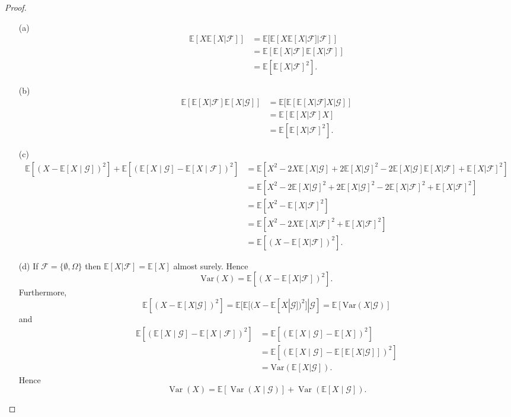 \documentclass{article}
\begin{document}
\begin{proof}
\begin{enumerate}
    \item[(a)] \begin{align*}
        \mathbb{E}[X\mathbb{E}[X|\mathcal{F}]]&=\mathbb{E}[\mathbb{E}[X\mathbb{E}[X|\mathcal{F}]|\mathcal{F}]]\\&=\mathbb{E}[\mathbb{E}[X|\mathcal{F}]\mathbb{E}[X|\mathcal{F}]]\\&=\mathbb{E}[\mathbb{E}[X|\mathcal{F}]^2].
    \end{align*}
    \item[(b)] \begin{align*}
        \mathbb{E}[\mathbb{E}[X|\mathcal{F}]\mathbb{E}[X|\mathcal{G}]]&=\mathbb{E}[\mathbb{E}[\mathbb{E}[X|\mathcal{F}]X|\mathcal{G}]]\\&=\mathbb{E}[\mathbb{E}[X|\mathcal{F}]X]\\&=\mathbb{E}[\mathbb{E}[X|\mathcal{F}]^2].
    \end{align*}
    \item[(c)] \begin{align*}
        \mathbb{E}[(X - \mathbb{E}[X \mid \mathcal{G}])^2] + \mathbb{E}[(\mathbb{E}[X \mid \mathcal{G}] - \mathbb{E}[X \mid \mathcal{F}])^2]&=\mathbb{E}[X^2-2X\mathbb{E}[X|\mathcal{G}]+2\mathbb{E}[X|\mathcal{G}]^2-2\mathbb{E}[X|\mathcal{G}]\mathbb{E}[X|\mathcal{F}]+\mathbb{E}[X|\mathcal{F}]^2]\\&=\mathbb{E}[X^2-2\mathbb{E}[X|\mathcal{G}]^2+2\mathbb{E}[X|\mathcal{G}]^2-2\mathbb{E}[X|\mathcal{F}]^2+\mathbb{E}[X|\mathcal{F}]^2]\\&=\mathbb{E}[X^2-\mathbb{E}[X|\mathcal{F}]^2]\\&=\mathbb{E}[X^2-2X\mathbb{E}[X|\mathcal{F}]^2+\mathbb{E}[X|\mathcal{F}]^2]\\&=\mathbb{E}[(X-\mathbb{E}[X|\mathcal{F}])^2].
    \end{align*}
    \item[(d)] If $\mathcal{F}=\{\emptyset,\Omega\}$ then $\mathbb{E}[X|\mathcal{F}]=\mathbb{E}[X]$ almost surely. Hence\[\text{Var}(X)=\mathbb{E}[(X-\mathbb{E}[X|\mathcal{F}])^2].\] Furthermore,\[\mathbb{E}[(X-\mathbb{E}[X|\mathcal{G}])^2]=\mathbb{E}[\mathbb{E}[(X-\mathbb{E}[X|\mathcal{G}])^2]|\mathcal{G}]=\mathbb{E}[\text{Var}(X|\mathcal{G})]\] and\begin{align*}\mathbb{E}[(\mathbb{E}[X \mid \mathcal{G}] - \mathbb{E}[X \mid \mathcal{F}])^2]&=\mathbb{E}[(\mathbb{E}[X \mid \mathcal{G}] - \mathbb{E}[X ])^2]\\&=\mathbb{E}[(\mathbb{E}[X \mid \mathcal{G}] - \mathbb{E}[\mathbb{E}[X|\mathcal{G}]])^2]\\&=\text{Var}(\mathbb{E}[X|\mathcal{G}]).\end{align*}
    Hence \[\operatorname{Var}(X) = \mathbb{E}[\operatorname{Var}(X \mid \mathcal{G})] + \operatorname{Var}(\mathbb{E}[X \mid \mathcal{G}]).\]
\end{enumerate}
\end{proof}
\end{document}
